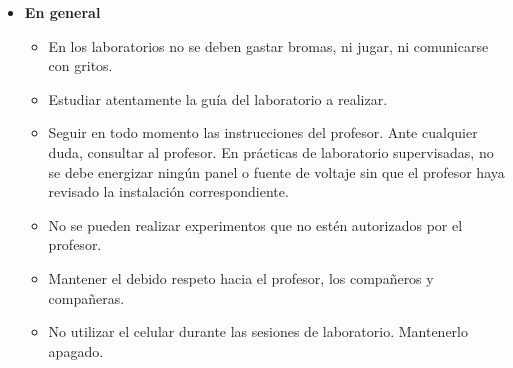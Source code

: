\documentclass{report}
\begin{document}
\begin{itemize}
\item \textbf{En general}\\
\begin{itemize}
\item En los laboratorios no se deben gastar bromas, ni jugar, ni comunicarse
con gritos.
\item Estudiar atentamente la guía del laboratorio a realizar.
\item Seguir en todo momento las instrucciones del profesor. Ante cualquier
duda, consultar al profesor.
En prácticas de laboratorio supervisadas, no se debe energizar ningún
panel o fuente de voltaje sin que el profesor haya revisado la instalación
correspondiente.
\item No se pueden realizar experimentos que no estén autorizados por el
profesor.
\item Mantener el debido respeto hacia el profesor, los compañeros y
compañeras.
\item No utilizar el celular durante las sesiones de laboratorio. Mantenerlo
apagado.
\end{itemize}


\end{itemize}
\end{document}
